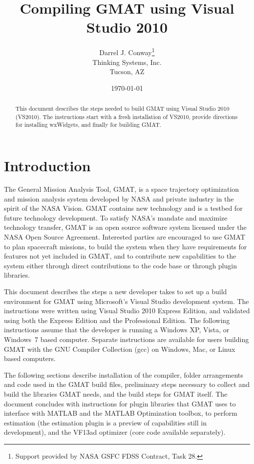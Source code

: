 \documentclass[letterpaper,10pt]{article}%
\begin{document}
\title{Compiling GMAT using Visual Studio 2010}
\author{Darrel J. Conway\thanks{Support provided by NASA GSFC FDSS Contract, Task 28.}
\\Thinking Systems, Inc.\\Tucson, AZ}
\date{\today}
\maketitle

\begin{abstract}
This document describes the steps needed to build GMAT using Visual Studio 2010 (VS2010).  The instructions start with a fresh installation of VS2010, provide directions for installing wxWidgets, and finally for building GMAT.
\end{abstract}

\section{Introduction}

The General Mission Analysis Tool, GMAT, is a space trajectory optimization and mission analysis system developed by NASA and private industry in the spirit of the NASA Vision. GMAT contains new technology and is a testbed for future technology development. To satisfy NASA's mandate and maximize technology transfer, GMAT is an open source software system licensed under the NASA Open Source Agreement.  Interested parties are encouraged to use GMAT to plan spacecraft missions, to build the system when they have requirements for features not yet included in GMAT, and to contribute new capabilities to the system either through direct contributions to the code base or through plugin libraries.

This document describes the steps a new developer takes to set up a build environment for GMAT using Microsoft's Visual Studio development system.  The instructions were written using Visual Studio 2010 Express Edition, and validated using both the Express Edition and the Professional Edition.  The following instructions assume that the developer is running a Windows XP, Vista, or Windows~7 based computer.  Separate instructions are available for users building GMAT with the GNU Compiler Collection (gcc) on Windows, Mac, or Linux based computers.

The following sections describe installation of the compiler, folder arrangements and code used in the GMAT build files, preliminary steps necessary to collect and build the libraries GMAT needs, and the build steps for GMAT itself.  The document concludes with instructions for plugin libraries that GMAT uses to interface with MATLAB and the MATLAB Optimization toolbox, to perform estimation (the estimation plugin is a preview of capabilities still in development), and the VF13ad optimizer (core code available separately).
\end{document}
